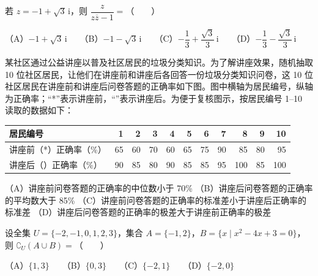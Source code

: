 



\begin{question}
若 $z=-1+\sqrt3\,\mathrm i$，则 $\dfrac{z}{z\overline z-1}=$\mbox{（　　）}

（A）$-1+\sqrt3\,\mathrm i$　　（B）$-1-\sqrt3\,\mathrm i$　　（C）$-\dfrac13+\dfrac{\sqrt3}{3}\,\mathrm i$　　（D）$-\dfrac13-\dfrac{\sqrt3}{3}\,\mathrm i$

\Needspace{0.4\textheight}
\end{question}
\begin{question}
某社区通过公益讲座以普及社区居民的垃圾分类知识。为了解讲座效果，随机抽取 10 位社区居民，让他们在讲座前和讲座后各回答一份垃圾分类知识问卷，这 10 位社区居民在讲座前和讲座后问卷答题的正确率如下图。图中横轴为居民编号，纵轴为正确率；“*”表示讲座前，“\textbullet{}”表示讲座后。为便于复核图示，按居民编号 1–10 读取的数据如下：

\begin{center}
\begingroup\setlength{\tabcolsep}{4pt}
\begin{tabular}{lrrrrrrrrrr}
\toprule
居民编号 & 1 & 2 & 3 & 4 & 5 & 6 & 7 & 8 & 9 & 10 \\
\midrule
讲座前（*）正确率（\%） & 65 & 60 & 70 & 60 & 65 & 75 & 90 & 85 & 80 & 95 \\
讲座后（\textbullet{}）正确率（\%） & 90 & 85 & 80 & 90 & 85 & 85 & 95 & 100 & 85 & 100 \\
\bottomrule
\end{tabular}
\endgroup
\end{center}

（A）讲座前问卷答题的正确率的中位数小于 70\%  
（B）讲座后问卷答题的正确率的平均数大于 85\%  
（C）讲座前问卷答题的正确率的标准差小于讲座后正确率的标准差  
（D）讲座后问卷答题的正确率的极差大于讲座前正确率的极差
\nopagebreak[4]
\begin{center}\end{center}
\nopagebreak[4]
\end{question}
\begin{question}
设全集 $U=\{-2,-1,0,1,2,3\}$，集合 $A=\{-1,2\}$，$B=\{x\mid x^2-4x+3=0\}$，则 $\complement_U(A\cup B)=$\mbox{（　　）}

（A）$\{1,3\}$　　（B）$\{0,3\}$　　（C）$\{-2,1\}$　　（D）$\{-2,0\}$

\Needspace{0.4\textheight}
\end{question}
